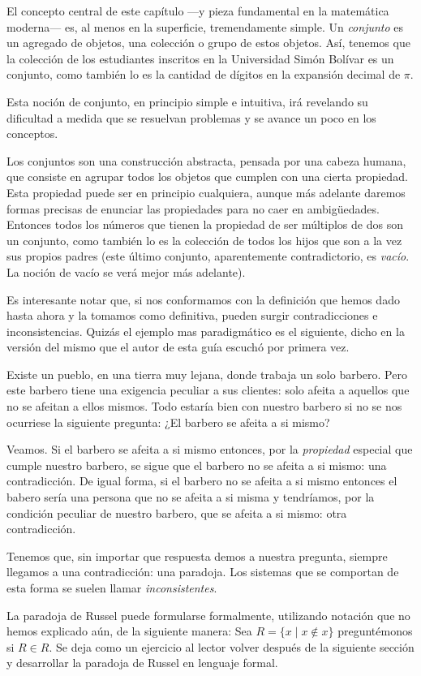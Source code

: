 El concepto central de este capítulo ---y pieza
 fundamental en la matemática moder\-na--- es, al menos
 en la superficie, tremendamente simple. Un
 \emph{conjunto} es un agregado de objetos, una
 colección o grupo de estos objetos. Así, tenemos que
 la colección de los estudiantes inscritos en la
 Universidad Simón Bolívar es un conjunto, como también
 lo es la cantidad de dígitos en la expansión decimal
 de $\pi$.

\begingroup Esta noción de conjunto, en principio
	simple e intuitiva, irá revelando su dificultad
	a medida que se resuelvan problemas y se avance
	un poco en los conceptos. 
\endgroup

	Los
	conjuntos son una construcción abstracta,
	pensada por una cabeza humana, que consiste en
	agrupar todos los objetos que cumplen con una
	cierta propiedad. Esta propiedad puede ser en
	principio cualquiera, aunque más adelante
	daremos formas precisas de enunciar las
	propiedades para no caer en ambigüedades.
	Entonces todos los números que tienen la
	propiedad de ser múltiplos de dos son un
	conjunto, como también lo es la colección de
	todos los hijos que son a la vez sus propios
	padres (este último conjunto, aparentemente
	contradictorio, es \emph{vacío}. La noción de
	vacío se verá mejor más adelante).

Es interesante notar que, si nos conformamos con la
definición que hemos dado hasta ahora y la tomamos como
definitiva, pueden surgir contradicciones e
inconsistencias. Quizás el ejemplo mas paradigmático es
el siguiente, dicho en la versión del mismo que el
autor de esta guía escuchó por primera vez.

\begin{ejem} Existe un pueblo, en
	una tierra muy lejana, donde trabaja un solo
	barbero. Pero este barbero tiene una exigencia
	peculiar a sus clientes: solo afeita a aquellos
	que no se afeitan a ellos mismos. Todo estaría
	bien con nuestro barbero si no se nos ocurriese
	la siguiente pregunta: ¿El barbero se afeita a
	si mismo?
	
	Veamos. Si el barbero se afeita a si mismo
	entonces, por la \emph{propiedad} especial que
	cumple nuestro barbero, se sigue que el barbero
	no se afeita a si mismo: una contradicción. De
	igual forma, si el barbero no se afeita a si
	mismo entonces el babero sería una persona que
	no se afeita a si misma y tendríamos, por la
	condición peculiar de nuestro barbero, que se
	afeita a si mismo: otra contradicción.
	
	Tenemos que, sin importar que respuesta demos a
	nuestra pregunta, siempre llegamos a una
	contradicción: una paradoja. Los sistemas que
	se comportan de esta forma se suelen llamar
	\emph{inconsistentes}.
	
	La paradoja de Russel puede formularse
formalmente, utilizando notación que no hemos explicado
aún, de la siguiente manera: Sea $R = \{ x \mid x
\notin x \}$ preguntémonos si $R\in R$. Se deja como un
ejercicio al lector volver después de la siguiente
sección y desarrollar la paradoja de Russel en lenguaje
formal.  
\end{ejem}

